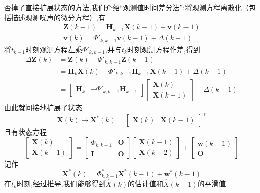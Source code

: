 \documentclass[cn,10pt,citestyle=gb7714-2015,bibstyle=gb7714-2015]{elegantbook}
\newcommand{\mT}{\mathrm{T}}
\begin{document}
否掉了直接扩展状态的方法,我们介绍\colorbox{yellow!20}{“观测值时间差分法”}:将观测方程离散化（包括描述观测噪声的微分方程）,有
\begin{gather}
  \bm{Z}(k-1)=\bm{H}_{k-1}\bm{X}(k-1)+\bm{v}(k-1)\\
  \bm{v}(k)=\bm{\varPhi}'_{k,k-1}\bm{v}(k-1)+\bm{\varDelta}(k-1)
\end{gather}
将$t_{k-1}$时刻观测方程左乘$\bm{\varPhi}'_{k,k-1}$,并与$t_k$时刻观测方程作差,得到
\begin{align*}
  \Delta\bm{Z}(k)&=\bm{Z}(k)-\bm{\varPhi}'_{k,k-1}\bm{Z}(k-1)\\
  &=\bm{H}_k\bm{X}(k)-\bm{\varPhi}'_{k,k-1}\bm{H}_{k-1}\bm{X}(k-1)+\bm{\varDelta}(k-1)\\
  &=\begin{bmatrix}
    \bm{H}_k&-\bm{\varPhi}'_{k,k-1}\bm{H}_{k-1}
  \end{bmatrix}\begin{bmatrix}
    \bm{X}(k)\\
    \bm{X}(k-1)
  \end{bmatrix}+\bm{\varDelta}(k-1)
\end{align*}
由此就间接地扩展了状态
\[
  \bm{X}(k)\longrightarrow\bm{X}^*(k)=\begin{bmatrix}
    \bm{X}(k)&\bm{X}(k-1)
  \end{bmatrix}^\mT
\]
且有状态方程
\begin{equation}
  \begin{bmatrix}
    \bm{X}(k)\\
    \bm{X}(k-1)
  \end{bmatrix}=\begin{bmatrix}
    \bm{\varPhi}_{k,k-1}&\bm{O}\\
    \bm{I}&\bm{O}
  \end{bmatrix}\begin{bmatrix}
    \bm{X}(k-1)\\
    \bm{X}(k-2)
  \end{bmatrix}+\begin{bmatrix}
    \bm{w}(k-1)\\
    \bm{O}
  \end{bmatrix}
\end{equation}
记作
\begin{equation}
  \bm{X}^*(k)=\bm{\varPhi}^*_{k,k-1}\bm{X}^*(k-1)+\bm{w}^*(k-1)
\end{equation}
在$t_k$时刻,经过推导,我们能够得到$\hat{X}(k)$的估计值和$\hat{X}(k-1)$的平滑值.
\end{document}
